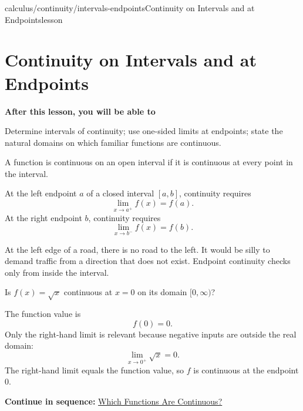 \documentclass[11pt,openany]{book}
\theoremstyle{bgplain}
\newcommand{\webnext}[2]{%
  \par\addvspace{1.2em}\noindent{\color{BGLine}\rule{\textwidth}{0.35pt}}\par\smallskip
  {\small\color{BGGray}\textbf{Continue in sequence:} \hyperlink{web:#1}{#2}}\par
}
\newcommand{\lessonobjective}[1]{%
  \par\Needspace{4\baselineskip}\addvspace{0.6em}%
  {\bfseries\color{BGInk}After this lesson, you will be able to}\par\smallskip
  #1\par\addvspace{0.5em}%
}
\begin{document}
\begin{webpage}{calculus/continuity/intervals-endpoints}{Continuity on Intervals and at Endpoints}{lesson}
\section{Continuity on Intervals and at Endpoints}

\lessonobjective{
Determine intervals of continuity; use one-sided limits at endpoints; state the natural domains on which familiar functions are continuous.
}

A function is continuous on an open interval if it is continuous at every point in the interval.

At the left endpoint \(a\) of a closed interval \([a,b]\), continuity requires
\[
  \lim_{x\to a^+}f(x)=f(a).
\]
At the right endpoint \(b\), continuity requires
\[
  \lim_{x\to b^-}f(x)=f(b).
\]

\begin{bgconcept}
At the left edge of a road, there is no road to the left. It would be silly to demand traffic from a direction that does not exist. Endpoint continuity checks only from inside the interval.
\end{bgconcept}

\begin{bgguided}[title={Square root at its endpoint}]
Is \(f(x)=\sqrt{x}\) continuous at \(x=0\) on its domain \([0,\infty)\)?

\begin{bgsolution}
The function value is
\[
  f(0)=0.
\]
Only the right-hand limit is relevant because negative inputs are outside the real domain:
\[
  \lim_{x\to0^+}\sqrt{x}=0.
\]
The right-hand limit equals the function value, so \(f\) is continuous at the endpoint \(0\).
\end{bgsolution}
\end{bgguided}
\webnext{calculus/continuity/continuous-functions}{Which Functions Are Continuous?}
\end{webpage}
\end{document}
